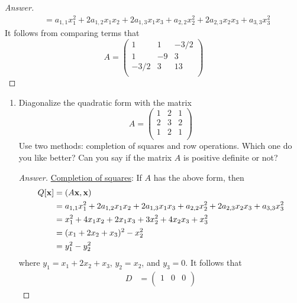 \documentclass[../psets.tex]{subfiles}
\begin{document}
\begin{enumerate}[label={\textbf{1.\arabic*.}}]
\begin{proof}[Answer]
\begin{align*}
            &= a_{1,1}x_1^2+2a_{1,2}x_1x_2+2a_{1,3}x_1x_3+a_{2,2}x_2^2+2a_{2,3}x_2x_3+a_{3,3}x_3^2
        \end{align*}
        It follows from comparing terms that
        \begin{equation*}
            A =
            \begin{pmatrix}
                1 & 1 & -3/2\\
                1 & -9 & 3\\
                -3/2 & 3 & 13\\
            \end{pmatrix}
        \end{equation*}
    \end{proof}
\end{enumerate}

\begin{enumerate}[label={\textbf{2.\arabic*.}}]
    \item Diagonalize the quadratic form with the matrix
    \begin{equation*}
        A =
        \begin{pmatrix}
            1 & 2 & 1\\
            2 & 3 & 2\\
            1 & 2 & 1\\
        \end{pmatrix}
    \end{equation*}
    Use two methods: completion of squares and row operations. Which one do you like better? Can you say if the matrix $A$ is positive definite or not?
    \begin{proof}[Answer]
        \underline{Completion of squares}: If $A$ has the above form, then
        \begin{align*}
            Q[\mathbf{x}] &= (A\mathbf{x},\mathbf{x})\\
            &= a_{1,1}x_1^2+2a_{1,2}x_1x_2+2a_{1,3}x_1x_3+a_{2,2}x_2^2+2a_{2,3}x_2x_3+a_{3,3}x_3^2\\
            &= x_1^2+4x_1x_2+2x_1x_3+3x_2^2+4x_2x_3+x_3^2\\
            &= (x_1+2x_2+x_3)^2-x_2^2\\
            &= y_1^2-y_2^2
        \end{align*}
        where $y_1=x_1+2x_2+x_3$, $y_2=x_2$, and $y_3=0$. It follows that
        \begin{align*}
            D &=
            \begin{pmatrix}
                1 & 0 & 0\\

\end{pmatrix}
\end{align*}
\end{proof}
\end{enumerate}
\end{document}

